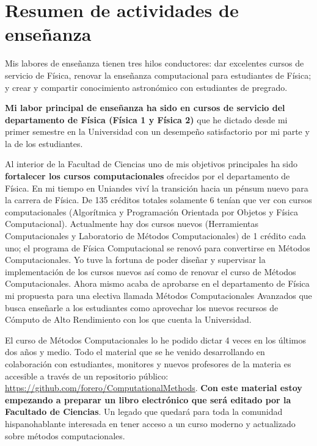 \documentclass[letterpaper,12pt,onecolumn]{article}
\begin{document}
\pagestyle{empty}
\section*{{\Large{\sc Resumen de actividades de ense\~nanza}}}

Mis labores de ense\~nanza tienen tres hilos conductores: dar excelentes
cursos de servicio de F\'isica, renovar la ense\~nanza computacional
para estudiantes de F\'isica; y crear y compartir conocimiento
astron\'omico con estudiantes de pregrado.

{\bf Mi labor principal de ense\~nanza ha sido en cursos de servicio del
departamento de F\'isica (F\'isica 1 y F\'isica 2)} que he dictado desde mi
primer semestre en la Universidad con un desempe\~no satisfactorio por
mi parte y la de los estudiantes.

Al interior de la Facultad de Ciencias uno de mis objetivos
principales ha sido {\bf fortalecer los cursos computacionales} ofrecidos por
el departamento de F\'isica. En mi tiempo en Uniandes viv\'i la transici\'on
hacia un p\'ensum nuevo para la carrera de F\'isica. De 135 cr\'editos
totales solamente 6 ten\'ian que ver con cursos computacionales
(Algor\'itmica y Programaci\'on Orientada por Objetos y 
F\'isica Computacional). Actualmente hay dos cursos nuevos (Herramientas
Computacionales y Laboratorio de M\'etodos Computacionales) de 1 cr\'edito
 cada uno; el programa de F\'isica Computacional se renov\'o para convertirse en
M\'etodos Computacionales. Yo tuve la fortuna de poder dise\~nar y
supervisar la implementaci\'on de los cursos nuevos as\'i como de renovar
el curso de M\'etodos  Computacionales. Ahora mismo acaba de aprobarse
en el departamento de F\'isica mi propuesta para una electiva llamada
M\'etodos Computacionales Avanzados que busca ense\~narle a los
estudiantes como aprovechar los nuevos  recursos de C\'omputo de Alto
Rendimiento con los que cuenta la Universidad.


El curso de M\'etodos Computacionales lo he podido dictar 4 veces en los
\'ultimos dos a\~nos y medio. Todo el material que se he venido
desarrollando en colaboraci\'on con estudiantes, monitores y nuevos
profesores de la materia es accesible a trav\'es de un
repositorio p\'ublico: \url{https://github.com/forero/ComputationalMethods}.
{\bf Con este material estoy empezando a preparar un libro electr\'onico que
ser\'a editado por la Facultado de Ciencias}. Un legado que quedar\'a para
toda la comunidad hispanohablante interesada en tener acceso a un
curso moderno y actualizado sobre m\'etodos computacionales.
\end{document}
